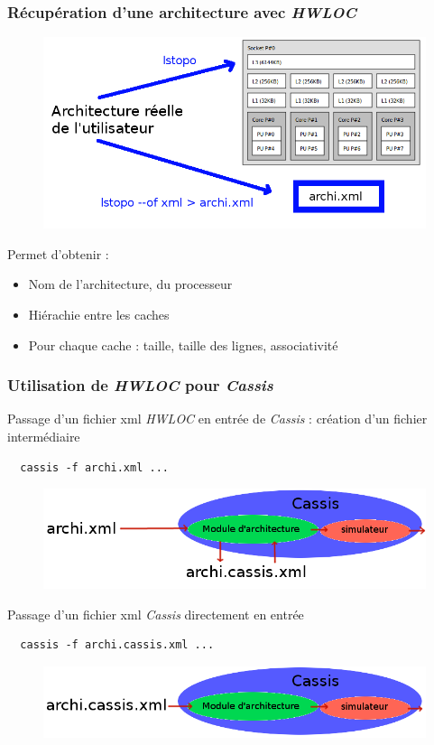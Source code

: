 \begin{frame}
  \frametitle{Récupération d'une architecture avec \emph{HWLOC}}
  \begin{figure}[t!]
    \includegraphics[width=.6\textwidth]{images/hwlocschema.png}
  \end{figure}

  Permet d'obtenir :
  \begin{itemize}
  \item Nom de l'architecture, du processeur
  \item Hiérachie entre les caches
  \item Pour chaque cache : taille, taille des lignes, associativité
  \end{itemize}

\end{frame}


\begin{frame}[fragile]
  \frametitle{Utilisation de \emph{HWLOC} pour \emph{Cassis}}

  Passage d'un fichier xml \emph{HWLOC} en entrée de \emph{Cassis} : création d'un fichier intermédiaire \\
\begin{verbatim}
  cassis -f archi.xml ...
\end{verbatim}

\begin{figure}[h!]
  \includegraphics[width=.4\textwidth]{images/archicassis1.png}
\end{figure}

Passage d'un fichier xml \emph{Cassis} directement en entrée \\
\begin{verbatim}
  cassis -f archi.cassis.xml ...
\end{verbatim}

\begin{figure}[t!]
  \includegraphics[width=.4\textwidth]{images/archicassis2.png}
\end{figure}
\end{frame}


